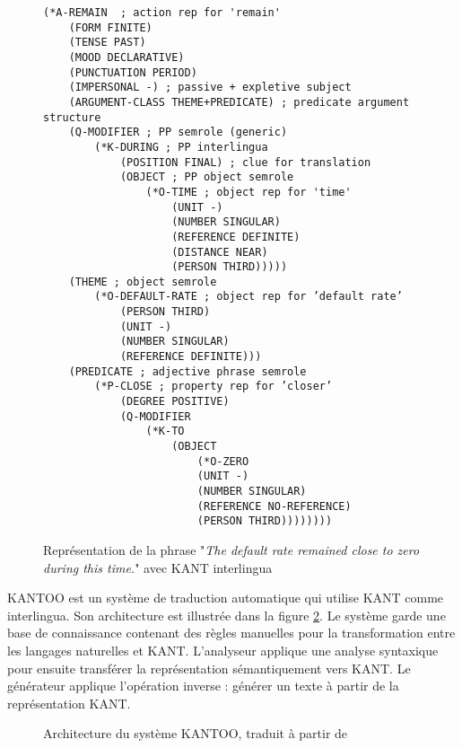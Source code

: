 \documentclass{KodeBook}
\begin{document}
\begin{figure}[!ht]
	\centering
\begin{multicols}{2}
\bfseries\tiny
\begin{verbatim}
(*A-REMAIN  ; action rep for 'remain'
    (FORM FINITE)
    (TENSE PAST)
    (MOOD DECLARATIVE)
    (PUNCTUATION PERIOD)
    (IMPERSONAL -) ; passive + expletive subject
    (ARGUMENT-CLASS THEME+PREDICATE) ; predicate argument structure
    (Q-MODIFIER ; PP semrole (generic)
        (*K-DURING ; PP interlingua
            (POSITION FINAL) ; clue for translation
 		    (OBJECT ; PP object semrole
 		        (*O-TIME ; object rep for 'time'
 		            (UNIT -)
 		            (NUMBER SINGULAR)
 		            (REFERENCE DEFINITE)
 		            (DISTANCE NEAR)
 		            (PERSON THIRD)))))
    (THEME ; object semrole
        (*O-DEFAULT-RATE ; object rep for ’default rate’
            (PERSON THIRD)
            (UNIT -)
            (NUMBER SINGULAR)
            (REFERENCE DEFINITE)))
    (PREDICATE ; adjective phrase semrole
        (*P-CLOSE ; property rep for ’closer’
            (DEGREE POSITIVE)
            (Q-MODIFIER
                (*K-TO
                    (OBJECT
                        (*O-ZERO
                        (UNIT -)
                        (NUMBER SINGULAR)
                        (REFERENCE NO-REFERENCE)
                        (PERSON THIRD))))))))
\end{verbatim}
\end{multicols}
	\caption{Représentation de la phrase "\textit{The default rate remained close to zero during this time.}" avec KANT interlingua \cite{98-czuba-al}}
	\label{fig:kant-exp}
\end{figure}

KANTOO \cite{00-nyberg-al} est un système de traduction automatique qui utilise KANT comme interlingua.
Son architecture est illustrée dans la figure \ref{fig:mt-kantoo-arch}.
Le système garde une base de connaissance contenant des règles manuelles pour la transformation entre les langages naturelles et KANT. 
L'analyseur applique une analyse syntaxique pour ensuite transférer la représentation sémantiquement vers KANT. 
Le générateur applique l'opération inverse : générer un texte à partir de la représentation KANT.

\begin{figure}[!ht]
	\centering
	\caption{Architecture du système KANTOO, traduit à partir de \cite{00-nyberg-al}}
	\label{fig:mt-kantoo-arch}
\end{figure}
\end{document}
